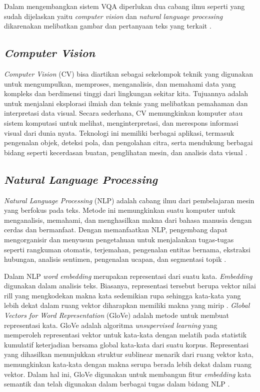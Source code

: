\par Dalam mengembangkan sistem VQA diperlukan dua cabang ilmu seperti yang sudah dijelaskan yaitu \textit{computer vision} dan \textit{natural language processing} dikarenakan melibatkan gambar dan pertanyaan teks yang terkait \citep{teney2017visual}.

\subsection{\textit{Computer Vision}}

\par \textit{Computer Vision} (CV) bisa diartikan sebagai sekelompok teknik yang digunakan untuk mengumpulkan, memproses, menganalisis, dan memahami data yang kompleks dan berdimensi tinggi dari lingkungan sekitar kita. Tujuannya adalah untuk menjalani eksplorasi ilmiah dan teknis yang melibatkan pemahaman dan interpretasi data visual. Secara sederhana, CV memungkinkan komputer atau sistem komputasi untuk melihat, menginterpretasi, dan merespons informasi visual dari dunia nyata. Teknologi ini memiliki berbagai aplikasi, termasuk pengenalan objek, deteksi pola, dan pengolahan citra, serta mendukung berbagai bidang seperti kecerdasan buatan, penglihatan mesin, dan analisis data visual \citep{jahne1999handbook}.


\subsection{\textit{Natural Language Processing}}

\par \textit{Natural Language Processing} (NLP) adalah cabang ilmu dari pembelajaran mesin yang berfokus pada teks. Metode ini memungkinkan suatu komputer untuk menganalisis, memahami, dan menghasilkan makna dari bahasa manusia dengan cerdas dan bermanfaat. Dengan memanfaatkan NLP, pengembang dapat mengorganisir dan menyusun pengetahuan untuk menjalankan tugas-tugas seperti rangkuman otomatis, terjemahan, pengenalan entitas bernama, ekstraksi hubungan, analisis sentimen, pengenalan ucapan, dan segmentasi topik \citep{agarwal2019overview}.

\par Dalam NLP \textit{word embedding} merupakan representasi dari suatu kata. \textit{Embedding} digunakan dalam analisis teks. Biasanya, representasi tersebut berupa vektor nilai rill yang mengkodekan makna kata sedemikian rupa sehingga kata-kata yang lebih dekat dalam ruang vektor diharapkan memiliki makna yang mirip \citep{teller2000speech}. \textit{Global Vectors for Word Representation} (GloVe) adalah metode untuk membuat representasi kata. GloVe adalah algoritma \textit{unsupervised learning} yang memperoleh representasi vektor untuk kata-kata dengan melatih pada statistik kumulatif keterjadian bersama global kata-kata dari suatu korpus. Representasi yang dihasilkan menunjukkan struktur sublinear menarik dari ruang vektor kata, memungkinkan kata-kata dengan makna serupa berada lebih dekat dalam ruang vektor. Dalam hal ini, GloVe digunakan untuk membangun fitur \textit{embedding} kata semantik dan telah digunakan dalam berbagai tugas dalam bidang NLP \citep{pennington2014glove}.

